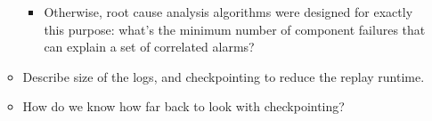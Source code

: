 \begin{itemize}
\begin{itemize}
\begin{itemize}
    \item Otherwise, root cause analysis algorithms were designed for exactly this purpose: what's the minimum number of component failures that can explain a set of correlated alarms?
  \end{itemize}
\item Describe size of the logs, and checkpointing to reduce the replay runtime.
\item How do we know how far back to look with checkpointing?
\end{itemize}
\end{itemize}


